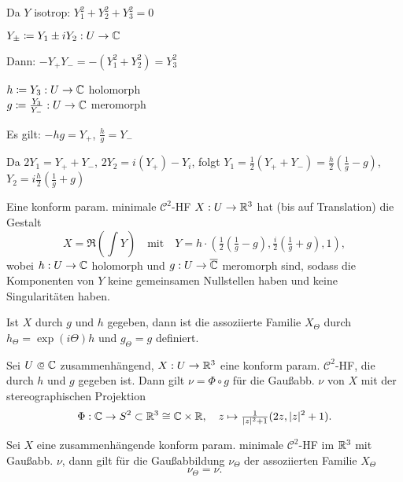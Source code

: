 \documentclass{cheat-sheet}
\newcommand{\Cont}{\mathcal{C}} %
\begin{document}
  Da $Y$ isotrop: $Y_1^2 + Y_2^2 + Y_3^2 = 0$

  \begin{defn}
    $Y_{\pm} \coloneqq Y_1 \pm i Y_2 : U \to \mathbb{C}$
  \end{defn}

  Dann: $- Y_{+} Y_{-} = - (Y_1^2 + Y_2^2) = Y_3^2$

  \begin{defn}
    $h \coloneqq Y_3 : U \to \mathbb{C}$ holomorph\\
    $g \coloneqq \tfrac{Y_3}{Y_{-}} : U \to \mathbb{C}$ meromorph
  \end{defn}

  Es gilt: $-hg = Y_{+}$, $\tfrac{h}{g} = Y_{-}$


  Da $2 Y_1 = Y_{+} + Y_{-}$, $2 Y_2 = i (Y_{+}) - Y_{i}$, folgt
  $Y_1 = \tfrac{1}{2} (Y_{+} + Y_{-}) = \tfrac{h}{2} (\tfrac{1}{g} - g)$, $Y_2 = i \tfrac{h}{2} (\tfrac{1}{g} + g)$
\fi

\begin{satz}
  Eine konform param. minimale $\Cont^2$-HF $X : U \to \mathbb{R}^3$ hat (bis auf Translation) die Gestalt
  \[
    X = \Re \left( {\textstyle \int} Y \right)
    \quad \text{mit} \quad
    Y = h \cdot (\tfrac{1}{2} (\tfrac{1}{g} - g), \tfrac{i}{2} (\tfrac{1}{g} + g), 1),
  \]
  wobei $h : U \to \mathbb{C}$ holomorph und $g : U \to \overline{\mathbb{C}}$ meromorph sind, sodass die Komponenten von $Y$ keine gemeinsamen Nullstellen haben und keine Singularitäten haben.
\end{satz}


\begin{beob}
  Ist $X$ durch $g$ und $h$ gegeben, dann ist die assoziierte Familie $X_{\Theta}$ durch $h_{\Theta} = \exp(i \Theta) h$ und $g_{\Theta} = g$ definiert.
\end{beob}

\begin{satz}
  Sei $U \opn \C$ zusammenhängend, $X : U \to \mathbb{R}^3$ eine konform param. $\Cont^2$-HF, die durch $h$ und $g$ gegeben ist. Dann gilt $\nu = \Phi \circ g$ für die Gaußabb. $\nu$ von $X$ mit der stereographischen Projektion
  \[
    \Phi : \mathbb{C} \to S^2 \subset \mathbb{R}^3 \cong \mathbb{C} \times \mathbb{R}, \quad z \mapsto \tfrac{1}{\lvert z\rvert^2 + 1} (2z, \lvert z\rvert^2 + 1).
  \]
\end{satz}

\begin{kor}
  Sei $X$ eine zusammenhängende konform param. minimale $\Cont^2$-HF im $\mathbb{R}^3$ mit Gaußabb. $\nu$, dann gilt für die Gaußabbildung $\nu_{\Theta}$ der assoziierten Familie $X_{\Theta}$
  \[ \nu_{\Theta} = \nu. \]
\end{kor}
\end{document}
